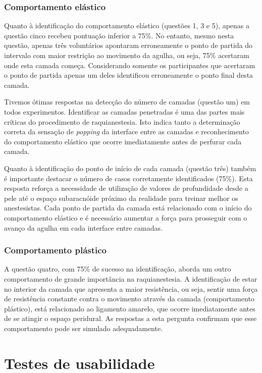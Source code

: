 \subsubsection{Comportamento elástico}

Quanto à identificação do comportamento elástico (questões 1, 3 e 5), apenas a questão cinco recebeu pontuação inferior a 75\%. No entanto, mesmo nesta questão, apenas três voluntários apontaram erroneamente o ponto de partida do intervalo com maior restrição ao movimento da agulha, ou seja, 75\% acertaram onde esta camada começa. Considerando somente os participantes que acertaram o ponto de partida apenas um deles identificou erroneamente o ponto final desta camada. 

Tivemos ótimas respostas na detecção do número de camadas (questão um) em todos experimentos. Identificar as camadas penetradas é uma das partes mais críticas do procedimento de raquianestesia. Isto indica tanto a determinação correta da sensação de \textit{popping} da interface entre as camadas e reconhecimento do comportamento elástico que ocorre imediatamente antes de perfurar cada camada.

Quanto à identificação do ponto de início de cada camada (questão três) também é importante destacar o número de casos corretamente identificados (75\%). Esta resposta reforça a necessidade de utilização de valores de profundidade desde a pele até o espaço subaracnóide próximo da realidade para treinar melhor os anestesistas. Cada ponto de partida da camada está relacionado com o início do comportamento elástico e é necessário aumentar a força para prosseguir com o avanço da agulha em cada interface entre camadas. 

\subsubsection{Comportamento plástico}

A questão quatro, com 75\% de sucesso na identificação, aborda um outro comportamento de grande importância na raquianestesia. A identificação de estar no interior da camada que apresenta a maior
resistência, ou seja, sentir uma força de resistência constante contra o movimento através da camada (comportamento plástico), está relacionado ao ligamento amarelo, que ocorre imediatamente antes de se atingir o espaço peridural. As respostas a esta pergunta
confirmam que esse comportamento pode ser simulado adequadamente.

\section{Testes de usabilidade}
\label{sec:testeUsabilidade}

